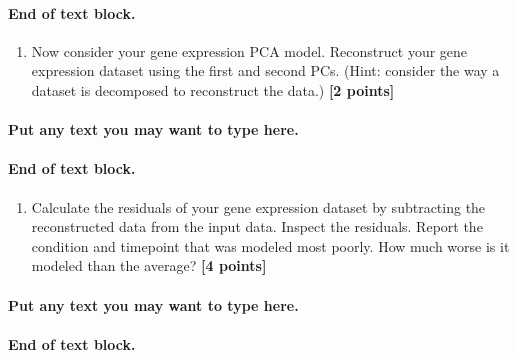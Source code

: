 \documentclass[
]{article}
\providecommand{\tightlist}{%
  \setlength{\itemsep}{0pt}\setlength{\parskip}{0pt}}
\begin{document}
\hypertarget{end-of-text-block.-17}{%
\paragraph{End of text block.}\label{end-of-text-block.-17}}

\begin{enumerate}
\def\labelenumi{\Alph{enumi})}
\setcounter{enumi}{3}
\tightlist
\item
  Now consider your gene expression PCA model. Reconstruct your gene
  expression dataset using the first and second PCs. (Hint: consider the
  way a dataset is decomposed to reconstruct the data.) \textbf{{[}2
  points{]}}
\end{enumerate}

\hypertarget{put-any-text-you-may-want-to-type-here.-16}{%
\paragraph{Put any text you may want to type
here.}\label{put-any-text-you-may-want-to-type-here.-16}}

\hypertarget{end-of-text-block.-18}{%
\paragraph{End of text block.}\label{end-of-text-block.-18}}

\begin{enumerate}
\def\labelenumi{\Alph{enumi})}
\setcounter{enumi}{4}
\tightlist
\item
  Calculate the residuals of your gene expression dataset by subtracting
  the reconstructed data from the input data. Inspect the residuals.
  Report the condition and timepoint that was modeled most poorly. How
  much worse is it modeled than the average? \textbf{{[}4 points{]}}
\end{enumerate}

\hypertarget{put-any-text-you-may-want-to-type-here.-17}{%
\paragraph{Put any text you may want to type
here.}\label{put-any-text-you-may-want-to-type-here.-17}}

\hypertarget{end-of-text-block.-19}{%
\paragraph{End of text block.}\label{end-of-text-block.-19}}
\end{document}
